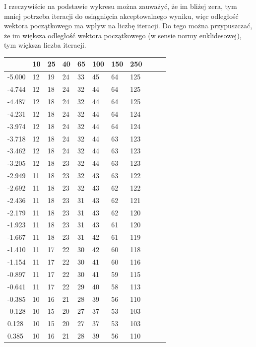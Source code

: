 \documentclass{article}
\begin{document}
I rzeczywiście na podstawie wykresu można zauważyć, że im bliżej zera, tym mniej potrzeba iteracji do osiągnięcia akceptowalnego
wyniku, więc odległość wektora początkowego ma wpływ na liczbę iteracji. Do tego można przypuszczać, że im większa odległość
wektora początkowego (w sensie normy euklidesowej), tym większa liczba iteracji.

\begin{table}[H]
\centering
\begin{tabular}{|l|l|l|l|l|l|l|l|l|l|l|}
\hline
& 10 & 25 & 40 & 65 & 100 & 150 & 250 \\ \hline
-5.000 & 12 & 19 & 24 & 33 & 45 & 64 & 125 \\ \hline
-4.744 & 12 & 18 & 24 & 32 & 44 & 64 & 125 \\ \hline
-4.487 & 12 & 18 & 24 & 32 & 44 & 64 & 125 \\ \hline
-4.231 & 12 & 18 & 24 & 32 & 44 & 64 & 124 \\ \hline
-3.974 & 12 & 18 & 24 & 32 & 44 & 64 & 124 \\ \hline
-3.718 & 12 & 18 & 24 & 32 & 44 & 63 & 123 \\ \hline
-3.462 & 12 & 18 & 24 & 32 & 44 & 63 & 123 \\ \hline
-3.205 & 12 & 18 & 23 & 32 & 44 & 63 & 123 \\ \hline
-2.949 & 11 & 18 & 23 & 32 & 43 & 63 & 122 \\ \hline
-2.692 & 11 & 18 & 23 & 32 & 43 & 62 & 122 \\ \hline
-2.436 & 11 & 18 & 23 & 31 & 43 & 62 & 121 \\ \hline
-2.179 & 11 & 18 & 23 & 31 & 43 & 62 & 120 \\ \hline
-1.923 & 11 & 18 & 23 & 31 & 43 & 61 & 120 \\ \hline
-1.667 & 11 & 18 & 23 & 31 & 42 & 61 & 119 \\ \hline
-1.410 & 11 & 17 & 22 & 30 & 42 & 60 & 118 \\ \hline
-1.154 & 11 & 17 & 22 & 30 & 41 & 60 & 116 \\ \hline
-0.897 & 11 & 17 & 22 & 30 & 41 & 59 & 115 \\ \hline
-0.641 & 11 & 17 & 22 & 29 & 40 & 58 & 113 \\ \hline
-0.385 & 10 & 16 & 21 & 28 & 39 & 56 & 110 \\ \hline
-0.128 & 10 & 15 & 20 & 27 & 37 & 53 & 103 \\ \hline
0.128 & 10 & 15 & 20 & 27 & 37 & 53 & 103 \\ \hline
0.385 & 10 & 16 & 21 & 28 & 39 & 56 & 110 \\ \hline

\end{tabular}
\end{table}
\end{document}
